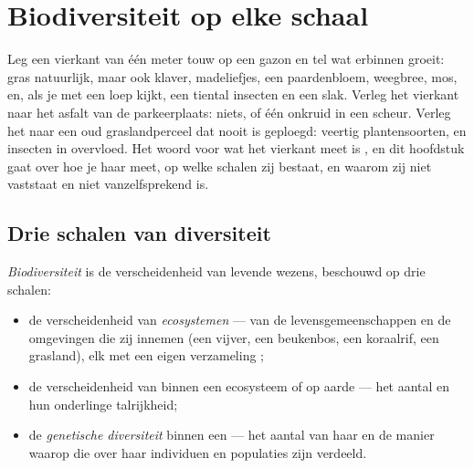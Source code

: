 \chapter{Biodiversiteit op elke schaal}\label{ch:g10:biodiversity-scales}

Leg een vierkant van één meter touw op een gazon en tel wat erbinnen
groeit: gras natuurlijk, maar ook klaver, madeliefjes, een paardenbloem,
weegbree, mos, en, als je met een loep kijkt, een tiental insecten en
een slak. Verleg het vierkant naar het asfalt van de parkeerplaats:
niets, of één onkruid in een scheur. Verleg het naar een oud
graslandperceel dat nooit is geploegd: veertig plantensoorten, en
insecten in overvloed. Het woord voor wat het vierkant meet is
\emph{}, en dit hoofdstuk gaat over hoe je haar meet, op
welke schalen zij bestaat, en waarom zij niet vaststaat en niet
vanzelfsprekend is.

\section{Drie schalen van diversiteit}

\begin{definition}[Biodiversiteit]\label{def:g10:biodiversity-scales:biodiversity}
\emph{Biodiversiteit} is de verscheidenheid van
levende wezens, beschouwd op drie schalen:
\begin{itemize}
  \item de verscheidenheid van \emph{ecosystemen} ---
        van de levensgemeenschappen en de omgevingen die zij innemen
        (een vijver, een beukenbos, een koraalrif, een grasland), elk
        met een eigen verzameling ;
  \item de verscheidenheid van  binnen een
        ecosysteem of op aarde --- het aantal  en hun onderlinge
        talrijkheid;
  \item de \emph{genetische diversiteit}
        binnen een  --- het aantal  van haar  en de
        manier waarop die over haar individuen en populaties zijn
        verdeeld.
\end{itemize}
\end{definition}

